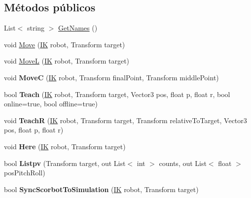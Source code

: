 \subsection*{Métodos públicos}
\begin{DoxyCompactItemize}
\item 
List$<$ string $>$ \mbox{\hyperlink{class_command_control_abb616afbdc86f4877b19b951982b6544}{Get\+Names}} ()
\item 
void \mbox{\hyperlink{class_command_control_a57aac28ce1f8ad74a4c2b69a24db8d79}{Move}} (\mbox{\hyperlink{class_i_k}{IK}} robot, Transform target)
\item 
void \mbox{\hyperlink{class_command_control_ab0c2d7d4d5b0ec2329f3bf945af1cbc0}{MoveL}} (\mbox{\hyperlink{class_i_k}{IK}} robot, Transform target)
\item 
\mbox{\label{class_command_control_a55788d3a11dcdb25426d84e3b7c75450}} 
void {\bfseries MoveC} (\mbox{\hyperlink{class_i_k}{IK}} robot, Transform final\+Point, Transform middle\+Point)
\item 
\mbox{\label{class_command_control_afa86230800735c59b15295e22301dafc}} 
bool {\bfseries Teach} (\mbox{\hyperlink{class_i_k}{IK}} robot, Transform target, Vector3 pos, float p, float r, bool online=true, bool offline=true)
\item 
\mbox{\label{class_command_control_a7d9c79f2e4d83fba39878b254d0c9616}} 
void {\bfseries TeachR} (\mbox{\hyperlink{class_i_k}{IK}} robot, Transform target, Transform relative\+To\+Target, Vector3 pos, float p, float r)
\item 
\mbox{\label{class_command_control_a9915c709ac0920b97e9ef9fb01d7cb8b}} 
void {\bfseries Here} (\mbox{\hyperlink{class_i_k}{IK}} robot, Transform target)
\item 
\mbox{\label{class_command_control_a150fcea4451c4cb929c0b0e2385c2698}} 
bool {\bfseries Listpv} (Transform target, out List$<$ int $>$ counts, out List$<$ float $>$ pos\+Pitch\+Roll)
\item 
\mbox{\label{class_command_control_a69ae96214c4e9cd5f8d3ded57cfe9ba3}} 
bool {\bfseries Sync\+Scorbot\+To\+Simulation} (\mbox{\hyperlink{class_i_k}{IK}} robot, Transform target)

\end{DoxyCompactItemize}
